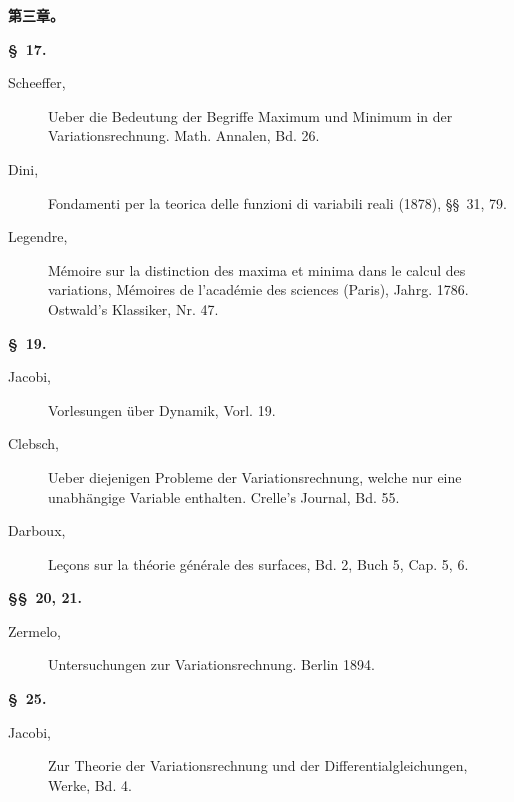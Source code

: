 \documentclass[11pt,a4paper,leqno]{article}
\begin{document}
\begin{center}
{\large\bfseries 第三章。}

{\bfseries \S~17.}
\end{center}

\begin{description}
\item[Scheeffer,] Ueber die Bedeutung der Begriffe Maximum und Minimum in der
Variationsrechnung. Math. Annalen, Bd. 26.

\item[Dini,] Fondamenti per la teorica delle funzioni di variabili reali
(1878), \S\S~31, 79.

\item[Legendre,] Mémoire sur la distinction des maxima et minima dans le calcul
des variations, Mémoires de l'académie des sciences (Paris), Jahrg. 1786.
Ostwald's Klassiker, Nr. 47.
\end{description}

\begin{center}{\bfseries \S~19.}\end{center}

\begin{description}
\item[Jacobi,] Vorlesungen über Dynamik, Vorl. 19.

\item[Clebsch,] Ueber diejenigen Probleme der Variationsrechnung, welche nur
eine unabhängige Variable enthalten. Crelle's Journal, Bd. 55.

\item[Darboux,] Leçons sur la théorie générale des surfaces, Bd. 2, Buch 5,
Cap. 5, 6.
\end{description}

\begin{center}{\bfseries \S\S~20, 21.}\end{center}

\begin{description}
\item[Zermelo,] Untersuchungen zur Variationsrechnung. Berlin 1894.
\end{description}

\begin{center}{\bfseries \S~25.}\end{center}

\begin{description}
\item[Jacobi,] Zur Theorie der Variationsrechnung und der
Differentialgleichungen, Werke, Bd. 4.
\end{description}
\end{document}
